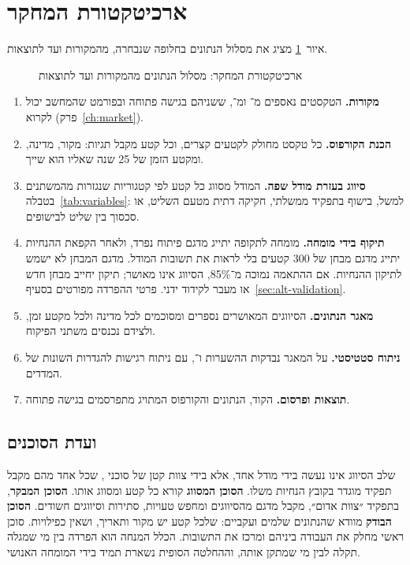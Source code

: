 \section{ארכיטקטורת המחקר}
\label{sec:alt-architecture}

איור~\ref{fig:alt-architecture} מציג את מסלול הנתונים בחלופה שנבחרה, מהמקורות ועד לתוצאות.

\begin{figure}[htbp]
  \centering
  
  \caption{ארכיטקטורת המחקר: מסלול הנתונים מהמקורות ועד לתוצאות}
  \label{fig:alt-architecture}
\end{figure}

\begin{enumerate}
  \item \textbf{מקורות.} הטקסטים נאספים מ־ ומ־, ששניהם בגישה פתוחה ובפורמט שהמחשב יכול לקרוא (פרק~\ref{ch:market}).
  \item \textbf{הכנת הקורפוס.} כל טקסט מחולק לקטעים קצרים, וכל קטע מקבל תגיות: מקור, מדינה, ומקטע הזמן של 25 שנה שאליו הוא שייך.
  \item \textbf{סיווג בעזרת מודל שפה.} המודל מסווג כל קטע לפי קטגוריות שנגזרות מהמשתנים בטבלה~\ref{tab:variables}: למשל, בישוף בתפקיד ממשלתי, חקיקה דתית מטעם השליט, או סכסוך בין שליט לבישופים.
  \item \textbf{תיקוף בידי מומחה.} מומחה לתקופה יתייג מדגם פיתוח נפרד, ולאחר הקפאת ההנחיות יתייג מדגם מבחן של 300 קטעים בלי לראות את תשובות המודל. מדגם המבחן לא ישמש לתיקון ההנחיות. אם ההתאמה נמוכה מ־85\%, הסיווג אינו מאושר; תיקון יחייב מבחן חדש או מעבר לקידוד ידני. פרטי ההפרדה מפורטים בסעיף~\ref{sec:alt-validation}.
  \item \textbf{מאגר הנתונים.} הסיווגים המאושרים נספרים ומסוכמים לכל מדינה ולכל מקטע זמן, ולצידם נכנסים משתני הפיקוח.
  \item \textbf{ניתוח סטטיסטי.} על המאגר נבדקות ההשערות  ו־, עם ניתוח רגישות להגדרות השונות של המדדים.
  \item \textbf{תוצאות ופרסום.} הקוד, הנתונים והקורפוס המתויג מתפרסמים בגישה פתוחה.
\end{enumerate}

\subsection*{ועדת הסוכנים}

שלב הסיווג אינו נעשה בידי מודל אחד, אלא בידי צוות קטן של סוכני , שכל אחד מהם מקבל תפקיד מוגדר בקובץ הנחיות משלו. \textbf{הסוכן המסווג} קורא כל קטע ומסווג אותו. \textbf{הסוכן המבקר}, בתפקיד ״צוות אדום״, מקבל מדגם מהסיווגים ומחפש טעויות, סתירות וסיווגים חשודים. \textbf{הסוכן הבודק} מוודא שהנתונים שלמים ועקביים: שלכל קטע יש מקור ותאריך, ושאין כפילויות. סוכן ראשי מחלק את העבודה ביניהם ומרכז את התשובות. הכלל המנחה הוא הפרדה בין מי שמגלה תקלה לבין מי שמתקן אותה, וההחלטה הסופית נשארת תמיד בידי המומחה האנושי.

